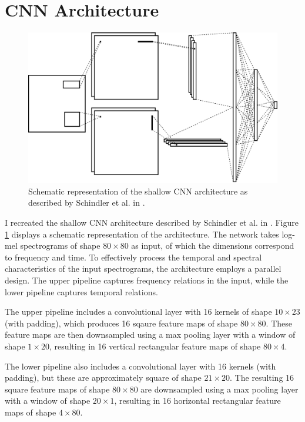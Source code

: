 \documentclass[conference]{IEEEtran}
\begin{document}
\section{CNN Architecture}

\begin{figure}[htbp]
    \centerline{\includegraphics[width=\columnwidth]{architecture.jpg}}
    \caption{Schematic representation of the shallow CNN architecture as described by Schindler et al. in \cite{SchindlerLidyRauber}.}
    \label{architecture}
\end{figure}

I recreated the shallow CNN architecture described by Schindler et al. in \cite{SchindlerLidyRauber}.
Figure \ref{architecture} displays a schematic representation of the architecture.
The network takes log-mel spectrograms of shape $80\times80$ as input, of which the dimensions correspond to frequency and time.
To effectively process the temporal and spectral characteristics of the input spectrograms, the architecture employs a parallel design.
The upper pipeline captures frequency relations in the input, while the lower pipeline captures temporal relations.

The upper pipeline includes a convolutional layer with 16 kernels of shape $10\times23$ (with padding), which produces 16 sqaure feature maps of shape $80\times80$.
These feature maps are then downsampled using a max pooling layer with a window of shape $1\times20$, resulting in 16 vertical rectangular feature maps of shape $80\times4$.

The lower pipeline also includes a convolutional layer with 16 kernels (with padding), but these are approximately square of shape $21\times20$.
The resulting 16 square feature maps of shape $80\times80$ are downsampled using a max pooling layer with a window of shape $20\times1$, resulting in 16 horizontal rectangular feature maps of shape $4\times80$.
\end{document}
